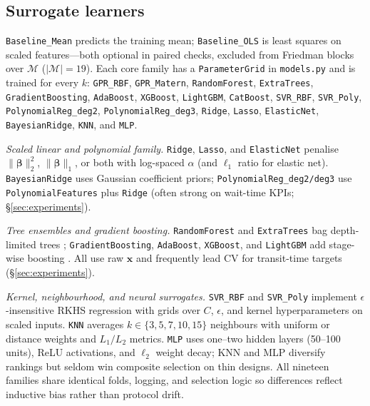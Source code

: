 \documentclass[12pt,twocolumn,a4paper]{article}
\theoremstyle{plain}
\theoremstyle{definition}
\theoremstyle{remark}
\begin{document}
\subsection{Surrogate learners}
\label{sec:method-learners}

\texttt{Baseline\_Mean} predicts the training mean; \texttt{Baseline\_OLS} is least squares on scaled features---both optional in paired checks, excluded from Friedman blocks over $\mathcal{M}$ ($|\mathcal{M}|{=}19$).
Each core family has a \texttt{ParameterGrid} in \texttt{models.py} and is trained for every $k$:
\texttt{GPR\_RBF}, \texttt{GPR\_Matern}, \texttt{RandomForest}, \texttt{ExtraTrees}, \texttt{GradientBoosting}, \texttt{AdaBoost}, \texttt{XGBoost}, \texttt{LightGBM}, \texttt{CatBoost}, \texttt{SVR\_RBF}, \texttt{SVR\_Poly}, \texttt{PolynomialReg\_deg2}, \texttt{PolynomialReg\_deg3}, \texttt{Ridge}, \texttt{Lasso}, \texttt{ElasticNet}, \texttt{BayesianRidge}, \texttt{KNN}, and \texttt{MLP}.

\emph{Scaled linear and polynomial family.}
\texttt{Ridge}, \texttt{Lasso}, and \texttt{ElasticNet} penalise $\|\boldsymbol{\beta}\|_2^2$, $\|\boldsymbol{\beta}\|_1$, or both with log-spaced $\alpha$ (and $\ell_1$ ratio for elastic net).
\texttt{BayesianRidge} uses Gaussian coefficient priors; \texttt{PolynomialReg\_deg2/deg3} use \texttt{PolynomialFeatures} plus \texttt{Ridge} (often strong on wait-time KPIs; \S\ref{sec:experiments}).

\emph{Tree ensembles and gradient boosting.}
\texttt{RandomForest} and \texttt{ExtraTrees} bag depth-limited trees \citep{breiman2001random}; \texttt{GradientBoosting}, \texttt{AdaBoost}, \texttt{XGBoost}, and \texttt{LightGBM} add stage-wise boosting \citep{friedman2001gbm,chen2016xgboost,ke2017lightgbm}.
All use raw $\mathbf{x}$ and frequently lead CV for transit-time targets (\S\ref{sec:experiments}).

\emph{Kernel, neighbourhood, and neural surrogates.}
\texttt{SVR\_RBF} and \texttt{SVR\_Poly} implement $\epsilon$-insensitive RKHS regression with grids over $C$, $\epsilon$, and kernel hyperparameters on scaled inputs.
\texttt{KNN} averages $k \in \{3,5,7,10,15\}$ neighbours with uniform or distance weights and $L_1/L_2$ metrics.
\texttt{MLP} uses one--two hidden layers (50--100 units), ReLU activations, and $\ell_2$ weight decay; KNN and MLP diversify rankings but seldom win composite selection on thin designs.
All nineteen families share identical folds, logging, and selection logic so differences reflect inductive bias rather than protocol drift.
\end{document}
